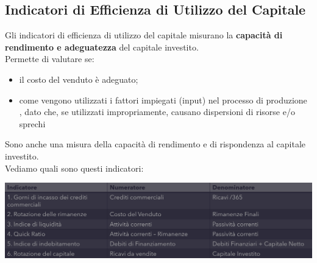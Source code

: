 \documentclass{article}
\begin{document}
\subsection{Indicatori di Efficienza di Utilizzo del Capitale}
Gli indicatori di efficienza di utilizzo del capitale misurano la
\textbf{capacità di rendimento e adeguatezza} del capitale investito.\\
Permette di valutare se:
\begin{itemize}
    \item il costo del venduto è adeguato;
    \item come vengono utilizzati i fattori impiegati (input) nel processo di produzione , dato che, se utilizzati
    impropriamente, causano dispersioni di risorse e/o sprechi
\end{itemize}
Sono anche una misura della capacità di rendimento e di rispondenza al
capitale investito.
\vspace*{0.2cm}\\
Vediamo quali sono questi indicatori:
\begin{center}
    \includegraphics[scale=0.3]{Image/IndicEff.png}
\end{center}
\end{document}
